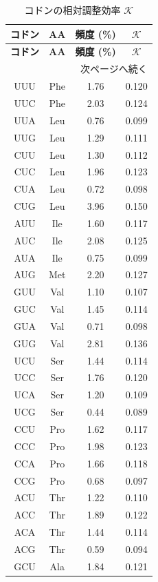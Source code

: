 \documentclass[12pt,a4paper]{ltjsarticle}
\newcommand{\REL}{\mathcal{K}}          %
\begin{document}
	\begin{longtable}{|c|c|c|c|}
		\caption{コドンの相対調整効率 \(\REL\)}\label{tab:codons}\\
		\hline
		\textbf{コドン} & \textbf{AA} & \textbf{頻度 (\%)} & \(\REL\) \\
		\hline
		\endfirsthead
		\hline
		\textbf{コドン} & \textbf{AA} & \textbf{頻度 (\%)} & \(\REL\) \\
		\hline
		\endhead
		\hline
		\multicolumn{4}{r}{次ページへ続く}\\
		\endfoot
		\hline
		\endlastfoot
		UUU & Phe & 1.76 & 0.120 \\
		UUC & Phe & 2.03 & 0.124 \\
		UUA & Leu & 0.76 & 0.099 \\
		UUG & Leu & 1.29 & 0.111 \\
		CUU & Leu & 1.30 & 0.112 \\
		CUC & Leu & 1.96 & 0.123 \\
		CUA & Leu & 0.72 & 0.098 \\
		CUG & Leu & 3.96 & 0.150 \\
		AUU & Ile & 1.60 & 0.117 \\
		AUC & Ile & 2.08 & 0.125 \\
		AUA & Ile & 0.75 & 0.099 \\
		AUG & Met & 2.20 & 0.127 \\
		GUU & Val & 1.10 & 0.107 \\
		GUC & Val & 1.45 & 0.114 \\
		GUA & Val & 0.71 & 0.098 \\
		GUG & Val & 2.81 & 0.136 \\
		UCU & Ser & 1.44 & 0.114 \\
		UCC & Ser & 1.76 & 0.120 \\
		UCA & Ser & 1.20 & 0.109 \\
		UCG & Ser & 0.44 & 0.089 \\
		CCU & Pro & 1.62 & 0.117 \\
		CCC & Pro & 1.98 & 0.123 \\
		CCA & Pro & 1.66 & 0.118 \\
		CCG & Pro & 0.68 & 0.097 \\
		ACU & Thr & 1.22 & 0.110 \\
		ACC & Thr & 1.89 & 0.122 \\
		ACA & Thr & 1.44 & 0.114 \\
		ACG & Thr & 0.59 & 0.094 \\
		GCU & Ala & 1.84 & 0.121 \\

\end{longtable}
\end{document}
